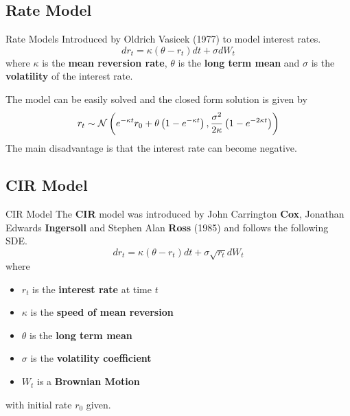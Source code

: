 
\subsection{Rate Model}
\begin{frame}{Rate Models}
	Introduced by Oldrich Vasicek (1977) to model interest rates.
	\[ dr_t = \kappa(\theta - r_t)dt + \sigma dW_t \]
	where \( \kappa \) is the \textbf{mean reversion rate},
	\( \theta \) is the \textbf{long term mean} and
	\( \sigma \) is the \textbf{volatility} of the interest rate.

	The model can be easily solved and the closed form solution is given by
	\[
		r_t \sim \mathcal{N} \left( e^{-\kappa t} r_0 + \theta
		\left( 1 - e^{-\kappa t} \right), \frac{\sigma^2}{2\kappa}
		\left( 1 - e^{-2\kappa t} \right) \right)
	\]
	The main disadvantage is that the interest rate can become negative.
\end{frame}


\subsection{CIR Model}
\begin{frame}{CIR Model}
	The \textbf{CIR} model was introduced by John Carrington \textbf{Cox},
	Jonathan Edwards \textbf{Ingersoll} and Stephen Alan \textbf{Ross} (1985)
	and follows the following SDE\@.
	\[ dr_t = \kappa(\theta - r_t)dt + \sigma \sqrt{r_t} dW_t \] where
	\begin{itemize}
		\item \( r_t \) is the \textbf{interest rate} at time \( t \)
		\item \( \kappa \) is the \textbf{speed of mean reversion}
		\item \( \theta \) is the \textbf{long term mean}
		\item \( \sigma \) is the \textbf{volatility coefficient}
		\item \( W_t \) is a \textbf{Brownian Motion}
	\end{itemize}
	with initial rate \( r_0 \) given.
\end{frame}


